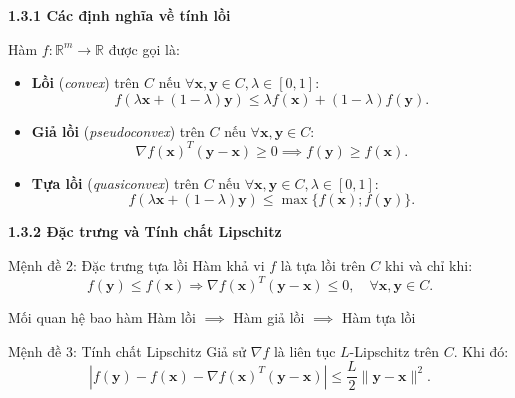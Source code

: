 \begin{frame}[t]{\textbf{\large 1.3.1 Các định nghĩa về tính lồi}}
    \vspace*{-1cm}
    \begin{defn}[Mangasarian 1965]
        Hàm $f: \mathbb{R}^m \to \mathbb{R}$ được gọi là:
        \begin{itemize}
            \item<1-> \textbf{Lồi} (\textit{convex}) trên $C$ nếu $\forall \mathbf{x}, \mathbf{y} \in C, \lambda \in [0, 1]$:
            \[
                f(\lambda\mathbf{x} + (1 - \lambda)\mathbf{y}) \le \lambda f(\mathbf{x}) + (1 - \lambda)f(\mathbf{y}).
            \]
            \item<2-> \textbf{Giả lồi} (\textit{pseudoconvex}) trên $C$ nếu $\forall \mathbf{x}, \mathbf{y} \in C$:
            \[
                \nabla f(\mathbf{x})^T(\mathbf{y} - \mathbf{x}) \ge 0 \implies f(\mathbf{y}) \ge f(\mathbf{x}).
            \]
            \item<3-> \textbf{Tựa lồi} (\textit{quasiconvex}) trên $C$ nếu $\forall \mathbf{x}, \mathbf{y} \in C, \lambda \in [0, 1]$:
            \[
                f(\lambda\mathbf{x} + (1 - \lambda)\mathbf{y}) \le \max\{f(\mathbf{x}); f(\mathbf{y})\}.
            \]
        \end{itemize}
    \end{defn}
\end{frame}

\begin{frame}[t]{\textbf{\large 1.3.2 Đặc trưng và Tính chất Lipschitz}}
    \vspace*{-1cm}
    \begin{block}{Mệnh đề 2: Đặc trưng tựa lồi}
        Hàm khả vi $f$ là tựa lồi trên $C$ khi và chỉ khi:
        \[
            f(\mathbf{y}) \le f(\mathbf{x}) \Rightarrow \nabla f(\mathbf{x})^T(\mathbf{y} - \mathbf{x}) \le 0, \quad \forall \mathbf{x}, \mathbf{y} \in C.
        \]
    \end{block}
    
    \pause
    
    \begin{alertblock}{Mối quan hệ bao hàm}
        Hàm lồi $\implies$ Hàm giả lồi $\implies$ Hàm tựa lồi
    \end{alertblock}

    \pause

    \begin{block}{Mệnh đề 3: Tính chất Lipschitz}
        Giả sử $\nabla f$ là liên tục $L$-Lipschitz trên $C$. Khi đó:
        \[
            |f(\mathbf{y}) - f(\mathbf{x}) - \nabla f(\mathbf{x})^T(\mathbf{y} - \mathbf{x})| \le \frac{L}{2} \|\mathbf{y} - \mathbf{x}\|^2.
        \]
    \end{block}
\end{frame}

